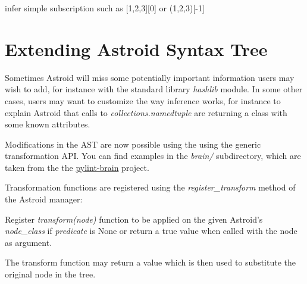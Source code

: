 \documentclass[letterpaper,10pt,english]{sphinxmanual}
\begin{document}

\begin{fulllineitems}
\label{inference:inference.infer_subscript}
infer simple subscription such as {[}1,2,3{]}{[}0{]} or (1,2,3){[}-1{]}

\end{fulllineitems}


\begin{fulllineitems}
\label{inference:inference.infer_unaryop}
\end{fulllineitems}



\chapter{Extending Astroid Syntax Tree}
\label{extending::doc}\label{extending:extending-astroid-syntax-tree}
Sometimes Astroid will miss some potentially important information
users may wish to add, for instance with the standard library
\emph{hashlib} module. In some other cases, users may want to customize the
way inference works, for instance to explain Astroid that calls to
\emph{collections.namedtuple} are returning a class with some known
attributes.

Modifications in the AST are now possible using the using the generic
transformation API. You can find examples in the \emph{brain/}
subdirectory, which are taken from the the \href{https://bitbucket.org/logilab/pylint-brain}{pylint-brain} project.

Transformation functions are registered using the \emph{register\_transform} method of
the Astroid manager:

\begin{fulllineitems}
\label{extending:astroid.manager.AstroidManager.register_transform}
Register \emph{transform(node)} function to be applied on the given
Astroid's \emph{node\_class} if \emph{predicate} is None or return a true value
when called with the node as argument.

The transform function may return a value which is then used to
substitute the original node in the tree.

\end{fulllineitems}
\end{document}
